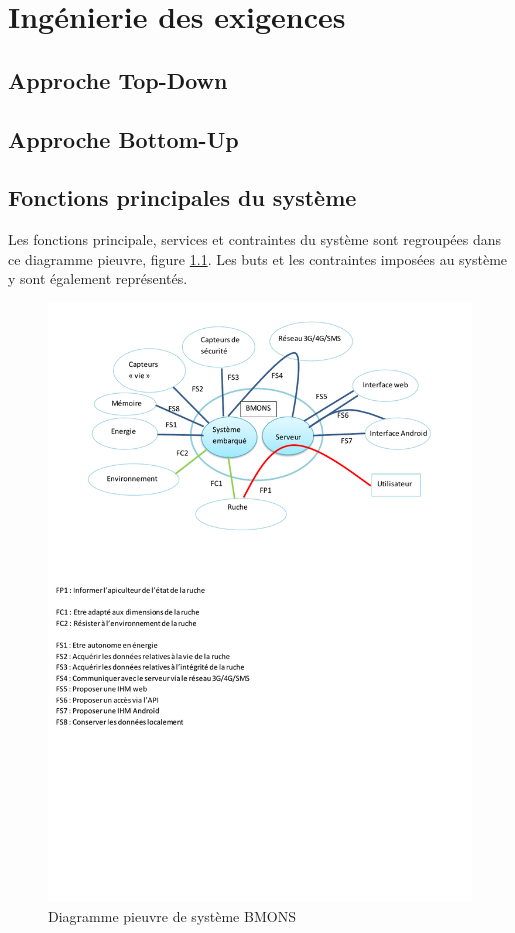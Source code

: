 \chapter{Ingénierie des exigences}
\section{Approche Top-Down}
\label{sec:top-down}

\section{Approche Bottom-Up}

\section{Fonctions principales du système}

Les fonctions principale, services et contraintes du système sont regroupées dans ce diagramme pieuvre, figure \ref{fig:diagpieuvre}. Les buts et les contraintes imposées au système y sont également représentés. 
 
\begin{figure}[h]
\centering\includegraphics[scale=0.7]{diagpieuvre.pdf}
\caption{\label{fig:diagpieuvre} Diagramme pieuvre de système BMONS}
\end{figure}


